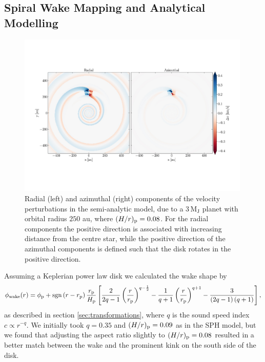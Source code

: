 
\subsection{Spiral Wake Mapping and Analytical Modelling}

\begin{figure}
    \centering
    \includegraphics[width = 0.99\textwidth]{figures/calcino_analytics.pdf}
    \caption{Radial (left) and azimuthal (right) components of the velocity perturbations in the semi-analytic model, due to a $3\, \mathrm{M_J}$ planet with orbital radius $250$ au, where $(H/r)_{\rm p}=0.08$. For the radial components the positive direction is associated with increasing distance from the centre star, while the positive direction of the azimuthal components is defined such that the disk rotates in the positive direction.}
    \label{fig:calcino_analytics}
\end{figure}

Assuming a Keplerian power law disk we calculated the wake shape by \citep{rafikov2002a}
\begin{align}
    \phi_{\rm wake}(r) = \phi_{\rm p} + {\rm sgn} \left( r - r_{\rm p} \right) \frac{r_{\rm p}}{H_{\rm p}} \left[ \frac{2}{2q-1} \left(\frac{r}{r_{\rm p}}\right)^{q-\frac{1}{2}} - \frac{1}{q+1} \left(\frac{r}{r_{\rm p}}\right)^{q+1} - \frac{3}{\left(2q-1\right)\left(q+1\right)} \right], \label{eq:power_law_wake}
\end{align}
as described in section \ref{sec:transformations}, where $q$ is the sound speed index $c \propto r^{-q}$.
We initially took $q=0.35$ and $(H/r)_{\rm p}=0.09$ as in the SPH model, but we found that adjusting the aspect ratio slightly to $(H/r)_{\rm p}=0.08$ resulted in a better match between the wake and the prominent kink on the south side of the disk.

